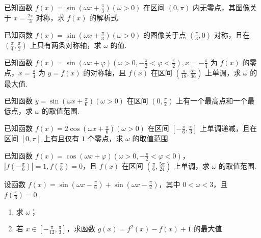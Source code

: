 \documentclass[a4paper , final]{ctexart}
\newenvironment{problem}[1]{%
  \item #1
  \par
  \vspace{8cm}
}{}
\begin{document}
\begin{problems}
    \begin{problem}
        {
            已知函数 $f(x) = \sin(\omega x +\frac{\pi}{3})(\omega > 0)$ 在区间 $(0,\pi)$ 内无零点，其图像关于 $x=\frac{2\pi}{3}$ 对称，求 $f(x)$ 的解析式.
        }
    \end{problem}

    \begin{problem}
        {
            已知函数 $f(x) = \sin(\omega x +\frac{\pi}{3})(\omega > 0)$ 的图像关于点 $(\frac{\pi}{3},0)$ 对称，且在 $(\frac{\pi}{4},\frac{\pi}{2})$ 上只有两条对称轴，求 $\omega$ 的值.
        }
    \end{problem}
    
    \begin{problem}
        {
            已知函数 $f(x) = \sin(\omega x +\varphi)(\omega > 0,-\frac{\pi}{2}<\varphi<\frac{\pi}{2}),x=-\frac{\pi}   {4}$ 为 $f(x)$ 的零点，$x=\frac{\pi}{4}$ 为 $y=f(x)$ 的对称轴，且 $f(x)$ 在区间 $\left(\frac{\pi}  {18},\frac{5\pi}{36}\right)$ 上单调，求 $\omega$ 的最大值.
        }
    \end{problem}

    \begin{problem}
        {
            已知函数 $y = \sin(\omega x +\frac{\pi}{6})(\omega > 0)$ 在区间 $(0,\frac{\pi}{2})$ 上有一个最高点和一个最低点，求 $\omega$ 的取值范围.
        }
    \end{problem}
    
    \begin{problem}
        {
            已知函数 $f(x) = 2\cos(\omega x +\frac{\pi}{6})(\omega > 0)$ 在区间 $[-\frac{\pi}{6},\frac{\pi}{3}]$ 上单调递减，且在区间 $[0,\pi]$ 上有且仅有 $1$ 个零点，求 $\omega$ 的取值范围.
        }
    \end{problem}

    \begin{problem}
        {
            已知函数 $f(x) = \cos(\omega x +\varphi)(\omega > 0,-\frac{\pi}{2}<\varphi<0)$，$\left\vert f(-\frac{\pi}{6})\right\vert=1,f(\frac{\pi}{6})=0$，且 $f(x)$ 在区间 $\left(\frac{\pi}{6},\frac{5\pi}{24}\right)$ 上单调，求 $\omega$ 的取值范围.
        }
    \end{problem}

    \begin{problem}
  {
    设函数 $f(x) = \sin\left(\omega x - \frac{\pi}{6}\right) + \sin\left(\omega x - \frac{\pi}{2}\right)$，其中 $0 < \omega < 3$，且 $f\left(\frac{\pi}{6}\right) = 0$.
    \begin{enumerate}[label=(\arabic*)]
      \item 求 $\omega$；
      \item 若 $x \in \left[-\frac{\pi}{12}, \frac{\pi}{3}\right]$，求函数 $g(x) = f^2(x) - f(x) + 1$ 的最大值.
    \end{enumerate}
  }


\end{problem}
\end{problems}
\end{document}
